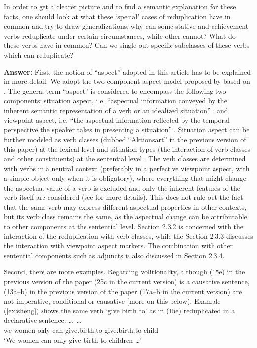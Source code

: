 \documentclass[fleqn,twoside]{article}
\begin{document}
\begin{enumerate}
In order to get a clearer picture and to find a semantic explanation for these facts, one should look at what these ‘special’ cases of reduplication have in common and try to draw generalizations: why can some stative and achievement verbs reduplicate under certain circumstances, while other cannot? What do these verbs have in common? Can we single out specific subclasses of these verbs which can reduplicate?

\noindent
\textbf{Answer:}\label{verbclass}
First, the notion of ``aspect'' adopted in this article has to be explained in more detail.
We adopt the two-component aspect model proposed by \citet{XiaoMcEnery2004} based on \citet{Smith1991}.
The general term ``aspect'' is considered to encompass the following two components:
situation aspect, i.e. ``aspectual information conveyed by the inherent semantic representation of a verb or an idealized situation'' \citep[21]{XiaoMcEnery2004};
and viewpoint aspect, i.e. ``the aspectual information reflected by the temporal perspective the speaker takes in presenting a situation'' \citep[21]{XiaoMcEnery2004}.
Situation aspect can be further modeled as verb classes (dubbed ``Aktionsart'' in the previous version of this paper) at the lexical level
and situation types (the interaction of verb classes and other constituents) at the sentential level \citep[33]{XiaoMcEnery2004}.
The verb classes are determined with verbs in a neutral context (preferably in a perfective viewpoint aspect, with a simple object only when it is obligatory),
where everything that might change the aspectual value of a verb is excluded
and only the inherent features of the verb itself are considered
(see \citealt[52]{XiaoMcEnery2004} for more details).
This does not rule out the fact that the same verb may express different aspectual properties in other contexts,
but its verb class remains the same,
as the aspectual change can be attributable to other components at the sentential level.
Section 2.3.2 is concerned with the interaction of the reduplication with verb classes,
while the Section 2.3.3 discusses the interaction with viewpoint aspect markers.
The combination with other sentential components such as adjuncts is also discussed in Section 2.3.4.%

Second, there are more examples.
Regarding volitionality, although (15e) in the previous version of the paper (25c in the current version) is a causative sentence, (13a--b) in the previous version of the paper (17a--b in the current version) are not imperative, conditional or causative (more on this below).
Example (\ref{ex:sheng}) shows the same verb  `give birth to' as in (15e) reduplicated in a declarative sentence.
\ea\label{ex:sheng}%
\gll {}  \ldots\,     \ldots \\
we women {} only can give.birth.to-give.birth.to child\\
\glt `We women can only give birth to children \ldots'
\z


\end{enumerate}
\end{document}
